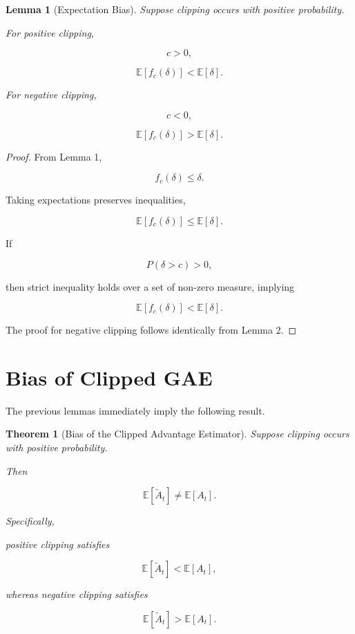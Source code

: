\documentclass[11pt]{article}
\newtheorem{lemma}{Lemma}
\newtheorem{theorem}{Theorem}
\begin{document}

\begin{lemma}[Expectation Bias]

Suppose clipping occurs with positive probability.

For positive clipping,

\[
c>0,
\]

\[
\mathbb E[f_c(\delta)]
<
\mathbb E[\delta].
\]

For negative clipping,

\[
c<0,
\]

\[
\mathbb E[f_c(\delta)]
>
\mathbb E[\delta].
\]

\end{lemma}

\begin{proof}

From Lemma 1,

\[
f_c(\delta)
\le
\delta.
\]

Taking expectations preserves inequalities,

\[
\mathbb E[f_c(\delta)]
\le
\mathbb E[\delta].
\]

If

\[
P(\delta>c)>0,
\]

then strict inequality holds over a set of non-zero measure, implying

\[
\mathbb E[f_c(\delta)]
<
\mathbb E[\delta].
\]

The proof for negative clipping follows identically from Lemma 2.

\end{proof}


\section{Bias of Clipped GAE}

The previous lemmas immediately imply the following result.

\begin{theorem}[Bias of the Clipped Advantage Estimator]

Suppose clipping occurs with positive probability.

Then

\[
\mathbb E[\widetilde A_t]
\neq
\mathbb E[A_t].
\]

Specifically,

positive clipping satisfies

\[
\mathbb E[\widetilde A_t]
<
\mathbb E[A_t],
\]

whereas negative clipping satisfies

\[
\mathbb E[\widetilde A_t]
>
\mathbb E[A_t].
\]

\end{theorem}
\end{document}
